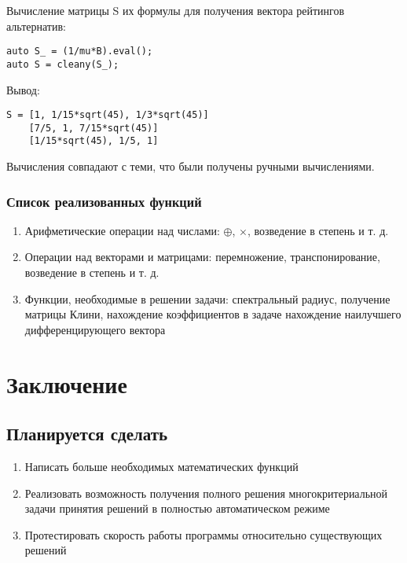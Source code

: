 \documentclass[specialist,
  substylefile = spbu.rtx,
  href,
  colorlinks=true,
  12pt]{disser}
\begin{document}
Вычисление матрицы S их формулы для получения вектора рейтингов альтернатив:
\begin{verbatim}
auto S_ = (1/mu*B).eval();
auto S = cleany(S_);
\end{verbatim}
Вывод:
\begin{verbatim}
S = [1, 1/15*sqrt(45), 1/3*sqrt(45)]
	[7/5, 1, 7/15*sqrt(45)]
	[1/15*sqrt(45), 1/5, 1]

\end{verbatim}

Вычисления совпадают с теми, что были получены ручными вычислениями.

	\subsection{Список реализованных функций}
  \begin{enumerate}
    \item Арифметические операции над числами: $\oplus$, $\times$, возведение в степень и т. д. 
    \item Операции над векторами и матрицами: перемножение, транспонирование, возведение в степень и т. д.
    \item Функции, необходимые в решении задачи: спектральный радиус, получение матрицы Клини, нахождение коэффициентов в задаче нахождение наилучшего дифференцирующего вектора
  \end{enumerate}

\chapter{Заключение}
\section{Планируется сделать}
  \begin{enumerate}
  	\item Написать больше необходимых математических функций
    \item Реализовать возможность получения полного решения многокритериальной задачи принятия решений в полностью автоматическом режиме
    \item Протестировать скорость работы программы относительно существующих решений
  \end{enumerate}

\printbibliography

\appendix
\cleardoublepage\makeatletter\@openrightfalse\makeatother
\end{document}
